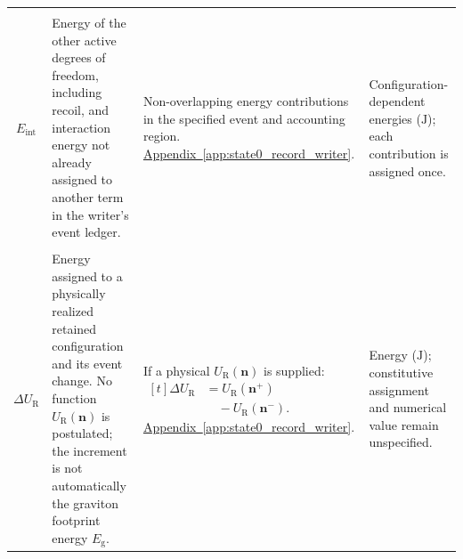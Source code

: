 \begin{longtable}{@{} c p{5.5cm} p{4cm} p{3.5cm} @{}}
\begin{tabular}[c]{@{}c@{}}
    $E_{\mathrm{AV}\setminus\gamma}$ \\
    $E_{\mathrm{int}}$
\end{tabular}
& {\raggedright
Energy of the other active degrees of freedom, including recoil,
and interaction energy not already assigned to another term in
the writer's event ledger.
\par}
& {\raggedright
Non-overlapping energy contributions in the specified event
and accounting region.
\newline
\hyperref[app:state0_record_writer]{Appendix~\ref*{app:state0_record_writer}}.
\par}
& {\raggedright
Configuration-dependent energies ($\mathrm J$);
each contribution is assigned once.
\par} \\

\begin{tabular}[c]{@{}c@{}}
    $U_{\mathrm R}$ \\
    $\Delta U_{\mathrm R}$
\end{tabular}
& {\raggedright
Energy assigned to a physically realized retained configuration
and its event change. No function $U_{\mathrm R}(\mathbf n)$ is
postulated; the increment is not automatically the graviton
footprint energy $E_{\mathrm g}$.
\par}
& {\raggedright
If a physical $U_{\mathrm R}(\mathbf n)$ is supplied:
\newline
$\begin{aligned}[t]
    \Delta U_{\mathrm R}&=U_{\mathrm R}(\mathbf n^{+}) \\
    &\quad-U_{\mathrm R}(\mathbf n^{-}).
\end{aligned}$
\newline
\hyperref[app:state0_record_writer]{Appendix~\ref*{app:state0_record_writer}}.
\par}
& {\raggedright
Energy ($\mathrm J$); constitutive assignment and numerical value
remain unspecified.
\par} \\


\end{longtable}
